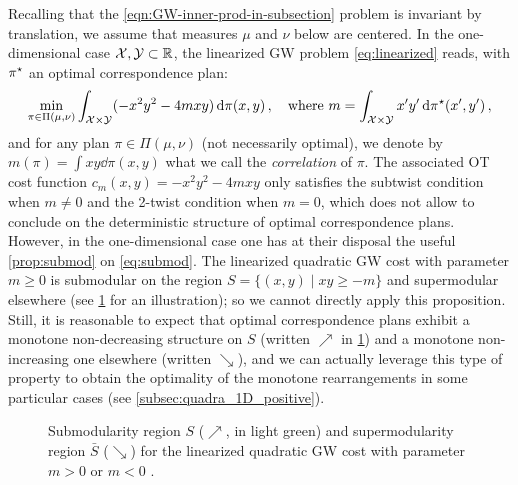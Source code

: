             Recalling that the \cref{eqn:GW-inner-prod-in-subsection} problem is invariant by translation, we assume that measures $\mu$ and $\nu$ below are centered. In the one-dimensional case $\mathcal{X},\mathcal{Y}\subset\mathbb{R}$, the linearized GW problem \cref{eq:linearized} reads, with $\pi^\star$ an optimal correspondence plan:
            \begin{equation}
                \label{eq:gw-1d-cont}
                \min_{\pi\in\Pi(\mu,\nu)} \int_{\mathcal{X}\times\mathcal{Y}} (-x^2y^2-4mxy)\,\mathrm d\pi(x,y)\,,\quad\text{where }m=\int_{\mathcal{X}\times\mathcal{Y}} x'y'\,\mathrm d\pi^\star(x',y')\,,
            \end{equation}
            and for any plan $\pi\in\Pi(\mu,\nu)$ (not necessarily optimal), we denote by $m(\pi)=\int xy\dd\pi(x,y)$ what we call the \emph{correlation} of $\pi$. The associated OT cost function $c_m(x,y)=-x^2y^2-4mxy$ only satisfies the subtwist condition when $m\neq0$ and the 2-twist condition when $m=0$, which does not allow to conclude on the deterministic structure of optimal correspondence plans. However, in the one-dimensional case one has at their disposal the useful \cref{prop:submod} on \cref{eq:submod}.
            The linearized quadratic GW cost with parameter $m\geq0$ is submodular on the region $S=\{(x,y)\mid xy\geq -m \}$ and supermodular elsewhere (see \cref{fig:submod2} for an illustration); so we cannot directly apply this proposition. Still, it is reasonable to expect that optimal correspondence plans exhibit a monotone non-decreasing structure on $S$ (written $\nearrow$ in \cref{fig:submod2}) and a monotone non-increasing one elsewhere (written $\searrow$), and we can actually leverage this type of property to obtain the optimality of the monotone rearrangements in some particular cases (see \cref{subsec:quadra_1D_positive}).
                \begin{figure}[!h]
                    \centering
                    \begin{subfigure}[t]{.49\textwidth}
                        \centering
                        
                        \vspace{-5mm}
                    \end{subfigure}
                    \hfill
                    \begin{subfigure}[t]{.49\textwidth}
                        \centering
                        
                        \vspace{-5mm}
                    \end{subfigure}
                    \caption{Submodularity region $S$ ($\nearrow$, in \textcolor{tabgreen}{light green}) and supermodularity region $\bar S$ ($\searrow$) for the linearized quadratic GW cost with parameter $m>0$ \capleft or $m<0$ \capright\!.}
                    \label{fig:submod2}
                \end{figure}

